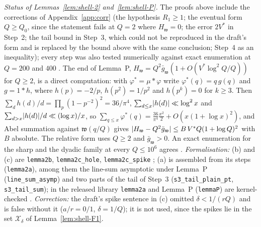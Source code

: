 \emph{Status of Lemmas~\ref{lem:shell-2} and~\ref{lem:shell-P}.} The proofs above include the corrections of Appendix~\ref{app:corr} (the hypothesis
$R_1\ge1$; the eventual form $Q\ge Q_0$, since the statement fails at $Q=2$ where $H_{\mathfrak w}=0$; the error $2V^*$ in Step~2; the tail bound in
Step~3, which could not be reproduced in the draft's form and is replaced by the bound above with the same conclusion; Step~4 as an
inequality); every step was also tested numerically against exact enumeration at $Q=200$ and $400$ \tagN. The end of Lemma~P,
$H_{\mathfrak w}=Q^2\bar g_{\mathfrak w}(1+O(V^*\log^2Q/Q))$ for $Q\ge2$, is a direct computation: with
$\varphi^*=\mu*\varphi$ write $\varphi^*(q)=q\,g(q)$ and $g=1*h$, where $h(p)=-2/p$, $h(p^2)=1/p^2$ and $h(p^k)=0$ for $k\ge3$. Then
$\sum_dh(d)/d=\prod_p(1-p^{-2})^2=36/\pi^4$, $\sum_{d\le x}\lvert h(d)\rvert\ll\log^2x$ and $\sum_{d>x}\lvert h(d)\rvert/d\ll(\log x)/x$, so
$\sum_{q\le x}\varphi^*(q)=\frac{36}{\pi^4}\frac{x^2}2+O(x(1+\log x)^2)$, and Abel summation against $\mathfrak w(q/Q)$ gives
$\lvert H_{\mathfrak w}-Q^2\bar g_{\mathfrak w}\rvert\le B\,V^*Q(1+\log Q)^2$ with $B$ absolute. The relative form uses $Q\ge2$ and $\bar g_{\mathfrak w}>0$. An exact enumeration
for the sharp and the dyadic family at every $Q\le10^6$ agrees \tagN.
\emph{Formalisation:} (b) and (c) are \texttt{lemma2b}, \texttt{lemma2c\_hole}, \texttt{lemma2c\_spike} \tagL; (a) is assembled
from its steps (\texttt{lemma2a}), among them the line-sum asymptotic under Lemma~P (\texttt{line\_sum\_asymp}) and two parts of the tail of Step~3
(\texttt{s3\_tail\_plain\_pt}, \texttt{s3\_tail\_sum}); in the released library \texttt{lemma2a} and Lemma~P (\texttt{lemmaP}) are
kernel-checked \tagL. \emph{Correction:} the draft's spike sentence in (c) omitted
$\delta<1/(rQ)$ and is false without it ($a/r=0/1$, $\delta=1/Q$); it is not used, since the spikes lie in the set $\mathcal X_\delta$ of
Lemma~\ref{lem:shell-F1}.

